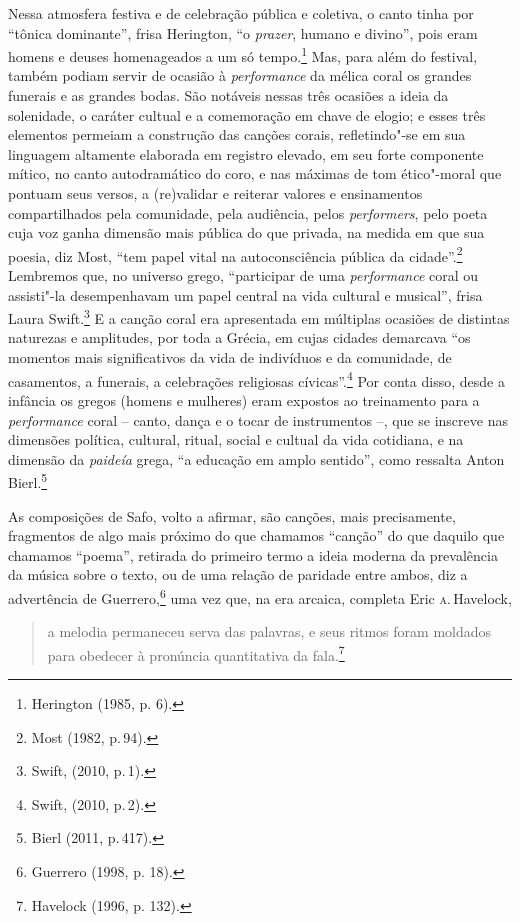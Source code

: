 Nessa atmosfera festiva e de celebração pública e coletiva, o canto tinha por
“tônica dominante”, frisa Herington, “o \textit{prazer}, humano e
divino”, pois eram homens e deuses homenageados a um só tempo.\footnote{ Herington (1985, p. 6).} Mas, para além
do festival, também podiam servir de ocasião à
\textit{performance} da mélica coral os grandes funerais e as grandes bodas.
São notáveis nessas três ocasiões a ideia da
solenidade, o caráter cultual e a comemoração em chave de elogio; e esses
três elementos permeiam a construção das canções corais, refletindo"-se
em sua linguagem altamente elaborada em registro elevado, em seu forte
componente mítico, no canto autodramático do coro, e nas máximas de tom
ético"-moral que pontuam seus versos, a (re)validar e reiterar valores e
ensinamentos compartilhados pela comunidade, pela audiência, pelos
\textit{performers}, pelo poeta cuja voz ganha dimensão mais
pública do que privada, na medida em que sua poesia, diz Most,
“tem papel vital na autoconsciência pública da cidade”.\footnote{Most (1982, p.\,94).}
Lembremos que, no universo grego, “participar de uma \textit{performance} coral ou assisti"-la desempenhavam um papel central na vida cultural e musical”, frisa Laura Swift.\footnote{Swift, (2010, p.\,1).} E a canção coral era apresentada em múltiplas ocasiões de distintas naturezas e amplitudes, por toda a Grécia, em cujas cidades demarcava “os momentos mais significativos da vida de indivíduos e da comunidade, de casamentos, a funerais, a celebrações religiosas cívicas”.\footnote{Swift, (2010, p.\,2).} Por conta disso, desde a infância os gregos (homens e mulheres) eram expostos ao treinamento para a \textit{performance} coral -- canto, dança e o tocar de instrumentos --, que se inscreve nas dimensões política, cultural, ritual, social e cultual da vida cotidiana, e na dimensão da \textit{paideía} grega, “a educação em amplo sentido”, como ressalta Anton Bierl.\footnote{Bierl (2011, p.\,417).}

As composições de Safo, volto a afirmar, são canções, mais
precisamente, fragmentos de algo mais próximo do que chamamos “canção” do que
daquilo que chamamos “poema”, retirada do primeiro termo a ideia moderna da
prevalência da música sobre o texto, ou de uma relação de paridade entre ambos,
diz a advertência de Guerrero,\footnote{ Guerrero (1998, p. 18).} uma vez que, na era arcaica,
completa Eric \textsc{a}.\,Havelock, 

\begin{quote}
a melodia permaneceu serva
das palavras, e seus ritmos foram moldados para obedecer à pronúncia
quantitativa da fala.\footnote{ Havelock (1996, p. 132).}
\end{quote}

